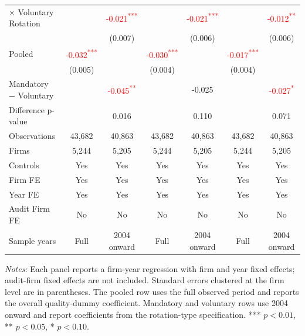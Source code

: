 \documentclass[10pt]{article}
\newcommand{\sym}[1]{\textsuperscript{#1}}
\begin{document}
\begin{minipage}{19cm}
\begin{threeparttable}
\begin{tabular}{l cc cc cc}
$\times$ Voluntary Rotation &  & \textcolor{red}{-0.021\sym{***}} &  & \textcolor{red}{-0.021\sym{***}} &  & \textcolor{red}{-0.012\sym{**}} \\
 &  & (0.007) &  & (0.006) &  & (0.006) \\
Pooled & \textcolor{red}{-0.032\sym{***}} &  & \textcolor{red}{-0.030\sym{***}} &  & \textcolor{red}{-0.017\sym{***}} &  \\
 & (0.005) &  & (0.004) &  & (0.004) &  \\
Mandatory $-$ Voluntary &  & \textcolor{red}{-0.045\sym{**}} &  & -0.025 &  & \textcolor{red}{-0.027\sym{*}} \\
Difference p-value &  & 0.016 &  & 0.110 &  & 0.071 \\
Observations & 43,682 & 40,863 & 43,682 & 40,863 & 43,682 & 40,863 \\
Firms & 5,244 & 5,205 & 5,244 & 5,205 & 5,244 & 5,205 \\
\midrule
Controls & Yes & Yes & Yes & Yes & Yes & Yes \\
Firm FE & Yes & Yes & Yes & Yes & Yes & Yes \\
Year FE & Yes & Yes & Yes & Yes & Yes & Yes \\
Audit Firm FE & No & No & No & No & No & No \\
Sample years & Full & 2004 onward & Full & 2004 onward & Full & 2004 onward \\
\bottomrule
\end{tabular}
\begin{tablenotes}\fontsize{9}{11}\selectfont
\item \fontsize{9}{11}\selectfont \textit{Notes:} Each panel reports a firm-year regression with firm and year fixed effects; audit-firm fixed effects are not included. Standard errors clustered at the firm level are in parentheses. The pooled row uses the full observed period and reports the overall quality-dummy coefficient. Mandatory and voluntary rows use 2004 onward and report coefficients from the rotation-type specification. *** \(p<0.01\), ** \(p<0.05\), * \(p<0.10\).
\end{tablenotes}
\end{threeparttable}

\end{minipage}
\end{document}
